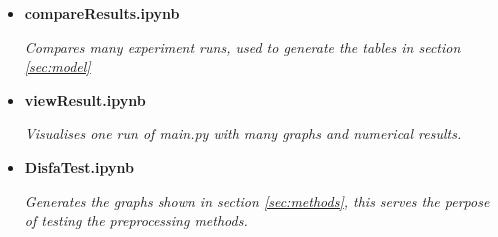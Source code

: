 {\begin{itemize}
\begin{itemize}
                \item {\bf compareResults.ipynb }
                \begin{sloppypar} \textit{Compares many experiment runs, used to generate the tables in section \ref{sec:model}}\end{sloppypar}
                \item {\bf viewResult.ipynb }
                \begin{sloppypar} \textit{Visualises one run of main.py with many graphs and numerical results.}\end{sloppypar}
                \item {\bf DisfaTest.ipynb }
                \begin{sloppypar} \textit{Generates the graphs shown in section \ref{sec:methods}, this serves the perpose of
                  testing the preprocessing methods.}\end{sloppypar}
              \end{itemize}

    \end{itemize}
  }
